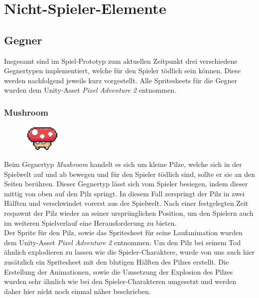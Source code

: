 
\section{Nicht-Spieler-Elemente} 
\label{non-player-elements}

\subsection{Gegner}
Insgesamt sind im Spiel-Prototyp zum aktuellen Zeitpunkt drei verschiedene Gegnertypen implementiert, welche für den Spieler tödlich sein können. Diese werden nachfolgend jeweils kurz vorgestellt. Alle Spritesheets für die Gegner wurden dem Unity-Asset \textit{Pixel Adventure 2} entnommen.

\subsubsection*{Mushroom}

\begin{figure}[H]
\includegraphics[width=20mm]{Figures/mushroom.png}
\label{fig:mushroom}
\end{figure}

Beim Gegnertyp \textit{Mushroom} handelt es sich um kleine Pilze, welche sich in der Spielwelt auf und ab bewegen und für den Spieler tödlich sind, sollte er sie an den Seiten berühren. Dieser Gegnertyp lässt sich vom Spieler besiegen, indem dieser mittig von oben auf den Pilz springt. In diesem Fall zerspringt der Pilz in zwei Hälften und verschwindet vorerst aus der Spielwelt. Nach einer festgelegten Zeit respawnt der Pilz wieder an seiner ursprünglichen Position, um den Spielern auch im weiteren Spielverlauf eine Herausforderung zu bieten.\\

Der Sprite für den Pilz, sowie das Spritesheet für seine Laufanimation wurden dem Unity-Asset \textit{Pixel Adventure 2} entnommen. Um den Pilz bei seinem Tod ähnlich explodieren zu lassen wie die Spieler-Charaktere, wurde von uns auch hier zusätzlich ein Spritesheet mit den blutigen Hälften des Pilzes erstellt. 
Die Erstellung der Animationen, sowie die Umsetzung der Explosion des Pilzes wurden sehr ähnlich wie bei den Spieler-Charakteren umgesetzt und werden daher hier nicht noch einmal näher beschrieben. \\

